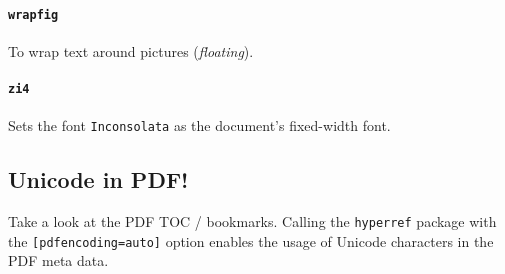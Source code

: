 \paragraph{\texttt{wrapfig}} %
\label{par:wrapfig}
To wrap text around pictures (\emph{floating}).
\paragraph{\texttt{zi4}} %
\label{par:texttt}
Sets the font \texttt{Inconsolata} as the document's fixed-width font.

\subsection{\texorpdfstring{Unicode in PDF!}{Unicode: A⁺ → B⁻ π⁺}} %
\label{sub:unicode_in_pdf_}
Take a look at the PDF TOC / bookmarks. Calling the \texttt{hyperref} package with the \texttt{[pdfencoding=auto]} option enables the usage of Unicode characters in the PDF meta data.
